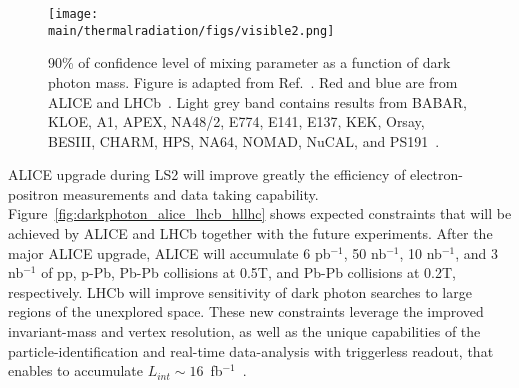 \documentclass[../report.tex]{subfiles}
\providecommand{\main}{..}
\begin{document}
\begin{figure}[htbp]
\begin{center}
\texttt{[image: \\main/thermalradiation/figs/visible2.png]}
\end{center}
\caption{90\% of confidence level of mixing parameter as a function of dark photon mass. Figure is adapted from Ref.~\cite{Ilten:2018crw}. 
Red and blue are from ALICE and LHCb~\cite{Aaij:2017rft}. 
Light grey band contains results from BABAR, KLOE, A1, APEX, NA48/2,  E774, E141, E137, KEK, Orsay, BESIII, CHARM, HPS, NA64, NOMAD, NuCAL, and PS191~\cite{Ilten:2018crw}.}
\label{fig:darkphoton_alice_lhcb}
\end{figure}
 

ALICE upgrade during LS2 will improve greatly 
the efficiency of electron-positron measurements and data taking capability.
Figure~\ref{fig:darkphoton_alice_lhcb_hllhc} shows 
expected constraints that will be achieved by ALICE and LHCb
together with the future experiments. 
After the major ALICE upgrade, ALICE will accumulate 
6 pb$^{-1}$, 50 nb$^{-1}$, 10 nb$^{-1}$, and 3 nb$^{-1}$
of pp, p-Pb, Pb-Pb collisions at 0.5T, and Pb-Pb collisions at 0.2T, 
respectively. 
LHCb will improve sensitivity of dark photon searches to large regions 
of the unexplored space. These new constraints leverage the improved invariant-mass and vertex resolution, 
as well as the unique capabilities of the particle-identification and real-time 
data-analysis with triggerless readout, 
that enables to accumulate $L_{int} \sim 16$~fb$^{-1}$~\cite{Ilten:2016tkc}.
\end{document}
